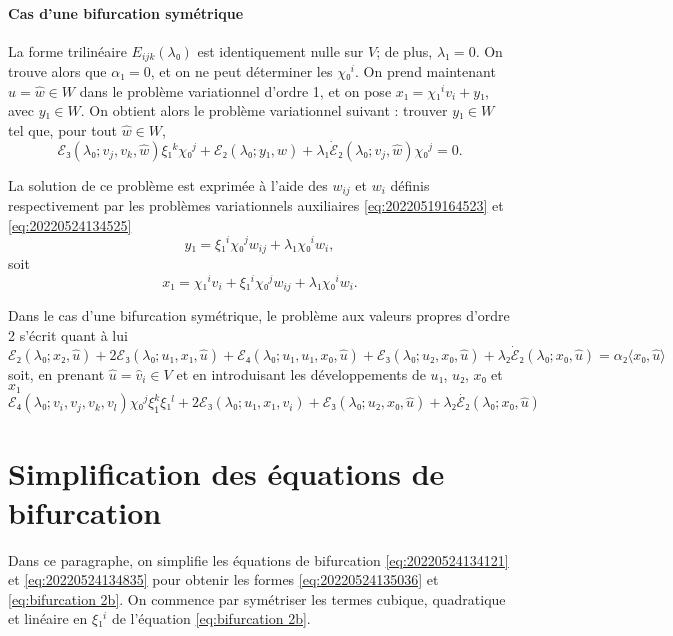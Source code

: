 \documentclass[12pt, final]{amsart}
\theoremstyle{definition}
\begin{document}
\paragraph{Cas d'une bifurcation symétrique} La forme trilinéaire
\(E_{i j k}(λ₀)\) est identiquement nulle sur \(V\); de plus, \(λ₁ = 0\). On
trouve alors que \(α₁ = 0\), et on ne peut déterminer les \(χ₀^i\). On prend
maintenant \(\hat{u} = \hat{w}∈W\) dans le problème variationnel d'ordre 1, et
on pose \(x₁ = χ₁^i v_i + y₁\), avec \(y₁∈W\). On obtient alors le problème
variationnel suivant : trouver \(y₁∈W\) tel que, pour tout \(\hat{w}∈W\),
\begin{equation}
  ℰ₃(λ₀; v_j, v_k, \hat{w}) ξ₁^k χ₀^j + ℰ₂(λ₀; y₁, \hat{w}) + λ₁ \dot{ℰ}₂(λ₀; v_j, \hat{w}) χ₀^j = 0.
\end{equation}

La solution de ce problème est exprimée à l'aide des \(w_{i j}\) et \(w_i\)
définis respectivement par les problèmes variationnels auxiliaires
\eqref{eq:20220519164523} et \eqref{eq:20220524134525}
\begin{equation}
  y₁ = ξ₁^i χ₀^j w_{i j} + λ₁ χ₀^i w_i,
\end{equation}
soit
\begin{equation}
  x₁ = χ₁^i v_i + ξ₁^i χ₀^j w_{i j} + λ₁ χ₀^i w_i.
\end{equation}

Dans le cas d'une bifurcation symétrique, le problème aux valeurs propres d'ordre 2 s'écrit quant à lui
\begin{equation}
  ℰ₂(λ₀; x₂, \hat{u}) + 2ℰ₃(λ₀; u₁, x₁, \hat{u}) +ℰ₄ (λ₀; u₁, u₁, x₀, \hat{u}) + ℰ₃(λ₀; u₂, x₀, \hat{u}) + λ₂ \dot{ℰ}₂(λ₀; x₀, \hat{u}) = α₂ 〈 x₀, \hat{u} 〉
\end{equation}
soit, en prenant \(\hat{u} = \hat{v}_i∈V\) et en introduisant les développements
de \(u₁\), \(u₂\), \(x₀ \) et \(x₁\)
\begin{equation}
  ℰ₄ (λ₀; v_i, v_j, v_k, v_l) χ₀^j ξ_{1}^k ξ₁^l + 2ℰ₃(λ₀; u₁, x₁, v_i) +ℰ₃(λ₀ ; u₂, x₀, \hat{u}) + λ₂ \dot{ℰ₂}(λ₀; x₀, \hat{u})
\end{equation}

\section{Simplification des équations de
bifurcation}\label{sec:20220524134954}

Dans ce paragraphe, on simplifie les équations de bifurcation \eqref{eq:20220524134121} et \eqref{eq:20220524134835} pour obtenir les formes \eqref{eq:20220524135036} et \eqref{eq:bifurcation 2b}. On commence par symétriser les termes cubique, quadratique et linéaire en \(ξ₁^i\) de
l'équation \eqref{eq:bifurcation 2b}.
\end{document}
